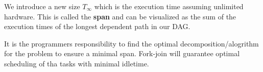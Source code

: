             \begin{definition}

                We introduce a new size $T_{\infty}$ which is the execution time assuming unlimited hardware. This is
                called the \textbf{span} and can be visualized as the sum of the execution times of the longest dependent
                path in our
                DAG.
            
\end{definition}

            It is the programmers responsibility to find the optimal decomposition/alogrithm for the problem to ensure a
            minimal span. Fork-join will guarantee optimal scheduling of tha tasks with minimal idletime.

        